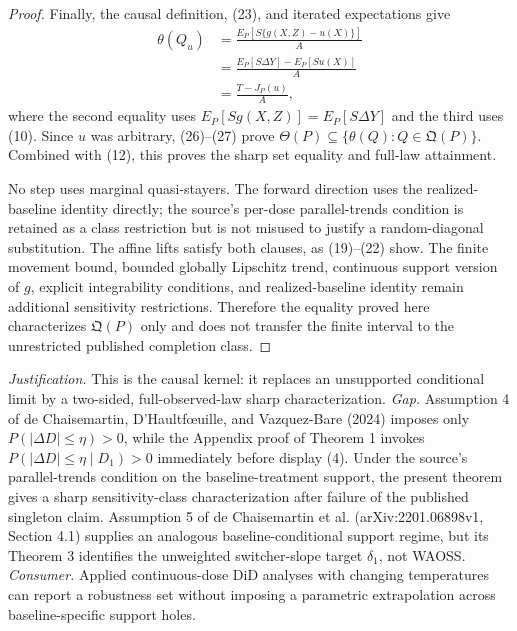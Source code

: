 \documentclass{article}
\begin{document}
\begin{proof}
Finally, the causal definition, (23), and iterated expectations give
\[
\begin{aligned}
\theta(Q_u)
&=\frac{E_P[S\{g(X,Z)-u(X)\}]}{A}\\
&=\frac{E_P[S\Delta Y]-E_P[Su(X)]}{A}\\
&=\frac{T-J_P(u)}{A},
\end{aligned} \tag{27}
\]
where the second equality uses \(E_P[Sg(X,Z)]=E_P[S\Delta Y]\) and the third uses (10). Since \(u\) was arbitrary, (26)--(27) prove \(\Theta(P)\subseteq\{\theta(Q):Q\in\mathfrak Q(P)\}\). Combined with (12), this proves the sharp set equality and full-law attainment.

No step uses marginal quasi-stayers. The forward direction uses the realized-baseline identity directly; the source's per-dose parallel-trends condition is retained as a class restriction but is not misused to justify a random-diagonal substitution. The affine lifts satisfy both clauses, as (19)--(22) show. The finite movement bound, bounded globally Lipschitz trend, continuous support version of \(g\), explicit integrability conditions, and realized-baseline identity remain additional sensitivity restrictions. Therefore the equality proved here characterizes \(\mathfrak Q(P)\) only and does not transfer the finite interval to the unrestricted published completion class.
\end{proof}
\par\smallskip\noindent \textit{Justification.} This is the causal kernel: it replaces an unsupported conditional limit by a two-sided, full-observed-law sharp characterization. \textit{Gap.} Assumption 4 of de Chaisemartin, D'Haultf\oe{}uille, and Vazquez-Bare (2024) imposes only \(P(|\Delta D|\le\eta)>0\), while the Appendix proof of Theorem 1 invokes \(P(|\Delta D|\le\eta\mid D_1)>0\) immediately before display (4). Under the source's parallel-trends condition on the baseline-treatment support, the present theorem gives a sharp sensitivity-class characterization after failure of the published singleton claim. Assumption 5 of de Chaisemartin et al. (arXiv:2201.06898v1, Section 4.1) supplies an analogous baseline-conditional support regime, but its Theorem 3 identifies the unweighted switcher-slope target \(\delta_1\), not WAOSS. \textit{Consumer.} Applied continuous-dose DiD analyses with changing temperatures can report a robustness set without imposing a parametric extrapolation across baseline-specific support holes.
\end{document}
